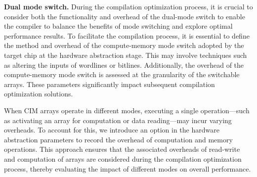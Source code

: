 \noindent   
\textbf{Dual mode switch.} 
During the compilation optimization process, it is crucial to consider both the functionality and overhead of the dual-mode switch to enable the compiler to balance the benefits of mode switching and explore optimal performance results.
To facilitate the compilation process, it is essential to define the method and overhead of the compute-memory mode switch adopted by the target chip at the hardware abstraction stage. This may involve techniques such as altering the inputs of wordlines or bitlines. Additionally, the overhead of the compute-memory mode switch is assessed at the granularity of the switchable arrays. These parameters significantly impact subsequent compilation optimization solutions.
\begin{comment}
\end{comment}

When CIM arrays operate in different modes, executing a single operation—such as activating an array for computation or data reading—may incur varying overheads. To account for this, we introduce an option in the hardware abstraction parameters to record the overhead of computation and memory operations. 
This approach ensures that the associated overheads of read-write and computation of arrays are considered during the compilation optimization process, thereby evaluating the impact of different modes on overall performance.


